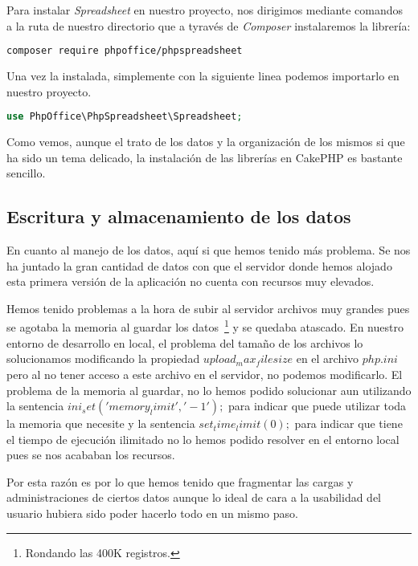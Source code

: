 Para instalar \textit{Spreadsheet} en nuestro proyecto, nos dirigimos mediante comandos a la ruta de nuestro directorio que a tyravés de \textit{Composer} instalaremos la librería:

\begin{lstlisting}[language=bash]
composer require phpoffice/phpspreadsheet
\end{lstlisting}

Una vez la instalada, simplemente con la siguiente linea podemos importarlo en nuestro proyecto.

\begin{lstlisting}[language=PHP]
use PhpOffice\PhpSpreadsheet\Spreadsheet;
\end{lstlisting}

Como vemos, aunque el trato de los datos y la organización de los mismos si que ha sido un tema delicado, la instalación de las librerías en CakePHP es bastante sencillo.

\subsection{Escritura y almacenamiento de los datos}

En cuanto al manejo de los datos, aquí si que hemos tenido más problema. Se nos ha juntado la gran cantidad de datos con que el servidor donde hemos alojado esta primera versión de la aplicación no cuenta con recursos muy elevados.

Hemos tenido problemas a la hora de subir al servidor archivos muy grandes pues se agotaba la memoria al guardar los datos~\footnote{Rondando las 400K registros.} y se quedaba atascado. En nuestro entorno de desarrollo en local, el problema del tamaño de los archivos lo solucionamos modificando la propiedad $upload_max_filesize$ en el archivo $php.ini$ pero al no tener acceso a este archivo en el servidor, no podemos modificarlo. El problema de la memoria al guardar, no lo hemos podido solucionar aun utilizando la sentencia $ini_set('memory_limit', '-1');$ para indicar que puede utilizar toda la memoria que necesite y la sentencia $set_time_limit(0);$ para indicar que tiene el tiempo de ejecución ilimitado no lo hemos podido resolver en el entorno local pues se nos acababan los recursos.

Por esta razón es por lo que hemos tenido que fragmentar las cargas y administraciones de ciertos datos aunque lo ideal de cara a la usabilidad del usuario hubiera sido poder hacerlo todo en un mismo paso.

